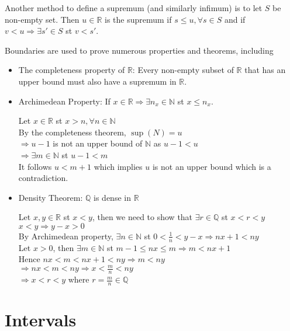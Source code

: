 \documentclass{article}
\begin{document}
Another method to define a supremum (and similarly infimum) is to let $S$ be non-empty set. Then $u \in \mathbb{R}$ is the supremum if $s \leq u, \forall s \in S$ and if $v < u \Rightarrow \exists s' \in S$ st $v < s'$.

Boundaries are used to prove numerous properties and theorems, including
\begin{itemize}
	\item The completeness property of $\mathbb{R}$: Every non-empty subset of $\mathbb{R}$ that has an upper bound must also have a supremum in $\mathbb{R}$.
	\item Archimedean Property: If $x \in \mathbb{R} \Rightarrow \exists n_x \in \mathbb{N}$ st $x \leq n_x$.
	\begin{tcolorbox}[colback=lightgray!10,colframe=lightgray!10, fontupper=\linespread{1.5}\selectfont]
		Let $x \in \mathbb{R}$ st $x > n, \forall n \in \mathbb{N}$\\
		By the completeness theorem, $\sup(N) = u$\\
		$\Rightarrow u-1$ is not an upper bound of $\mathbb{N}$ as $u-1 < u$\\
		$\Rightarrow \exists m \in \mathbb{N}$ st $u-1 < m$\\
		It follows $u < m+1$ which implies $u$ is not an upper bound which is a contradiction. 
	\end{tcolorbox}
	\item Density Theorem: $\mathbb{Q}$ is dense in $\mathbb{R}$
	\begin{tcolorbox}[colback=lightgray!10,colframe=lightgray!10, fontupper=\linespread{1.5}\selectfont]
		Let $x,y \in \mathbb{R}$ st $x < y$, then we need to show that $\exists r \in \mathbb{Q}$ st $x < r <y$ \\
		$x < y \Rightarrow y-x > 0$ \\		
		By Archimedean property, $\exists n \in \mathbb{N}$ st $0 < \frac{1}{n} < y-x \Rightarrow nx+1 < ny$ \\
		Let $x>0$, then $\exists m \in \mathbb{N}$ st $m-1 \leq nx \leq m \Rightarrow m < nx+1$ \\
		Hence $nx < m < nx+1 < ny \Rightarrow m < ny$ \\
		$\Rightarrow nx < m < ny \Rightarrow x < \frac{m}{n} < ny$ \\
		$\Rightarrow x < r < y$ where $r = \frac{m}{n} \in \mathbb{Q}$
	\end{tcolorbox}
\end{itemize}

\section{Intervals}
\end{document}
